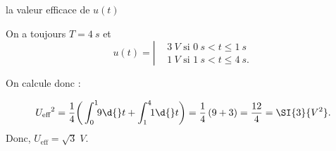 


\begin{enonce}
la valeur efficace de $u(t)$
\end{enonce}


\begin{corrige}
On a toujours $T=\SI{4}{s}$ et 
\begin{equation*}
u(t)=
\left|
\begin{aligned}
&\SI{3}{V} \textrm{ si }\SI{0}{s}<t\leq \SI{1}{s}\\
&\SI{1}{V} \textrm{ si }\SI{1}{s}<t\leq \SI{4}{s}.
\end{aligned}
\right.
\end{equation*}

On calcule donc : 

\begin{equation*}
{U_{\text{eff}}}^2=\dfrac{1}{4}\bigg(\int_0^1\!\!9\d{}t+\int_1^4\!\!1\d{}t\bigg)=\dfrac{1}{4}\left(9+3\right)=\dfrac{12}{4}=\SI{3}{V^2}.
\end{equation*}
Donc, $U_{\text{eff}}=\sqrt{3}\;\si{V}$.
\end{corrige}



\finEntrainement







\hauteurLargeurCadreReponse		{8mm}{2cm}
\initialisationEntrainement

